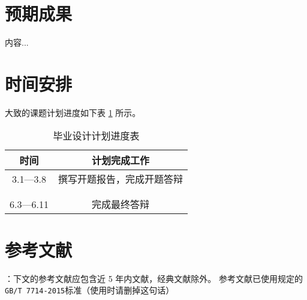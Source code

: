 \documentclass[UTF8,AutoFakeBold,AutoFakeSlant,zihao=-4]{ctexart}
\numberwithin{equation}{section}
\begin{document}
\newpage
\section{预期成果}
\begin{ubox}
	内容...
\end{ubox}

\newpage
\section{时间安排}
\begin{ubox}
大致的课题计划进度如下表 \ref{tab:progress} 所示。

\renewcommand*\arraystretch{1.5} 
\begin{table}[H]
  \centering
  \caption{毕业设计计划进度表}
  \label{tab:progress}
  \begin{tabular}{@{}cc@{}}
    \toprule
    时间 & 计划完成工作       \\ \midrule
    3.1—3.8 & 撰写开题报告，完成开题答辩 \\\hline
    & \\\hline
    & \\\hline
    6.3—6.11 & 完成最终答辩\\\bottomrule
  \end{tabular}

\end{table}

\end{ubox}

\newpage
\section{参考文献}
\begin{ubox}
：下文的参考文献应包含近 5 年内文献，经典文献除外。 参考文献已使用规定的\texttt{GB/T 7714-2015}标准（使用时请删掉这句话）
\printbibliography[heading=none]
\end{ubox}
\end{document}
